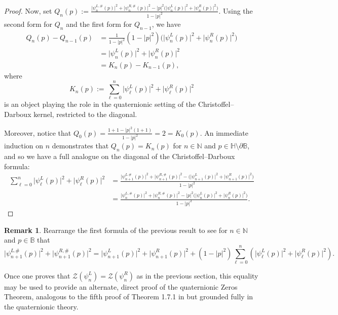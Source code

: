 \documentclass[11pt,reqno]{amsart}
\def\q{\psi}
\def\NN{\mathbb{N}}
\def\BB{\mathbb{B}}
\def\HH{\mathbb{H}}
\def\cZ{\mathcal{Z}}
\theoremstyle{definition}
\newtheorem{remark}[theorem]{Remark}
\numberwithin{equation}{section}
\begin{document}
\begin{proof}
Now, set \(Q_n(p) := \frac{\lvert \q_n^{L,\#}(p) \rvert^2 + \lvert \q_n^{R,\#}(p) \rvert^2 - \lvert p \rvert^2 \Big(\lvert \q_n^L(p)\rvert^2 + \lvert \q_n^R(p) \rvert^2\Big)}{1 - \lvert p \rvert^2}\). Using the second form for \(Q_n\) and the first form for \(Q_{n-1}\), we have
\begin{align*}
    Q_n(p) - Q_{n-1}(p) & = \frac{1}{1 - \lvert p \rvert^2} (1 - \lvert p \rvert^2)\Big(\lvert \q_n^L(p) \rvert^2 + \lvert \q_n^R(p) \rvert^2\Big) \\
    & = \lvert \q_n^L(p) \rvert^2 + \lvert \q_n^R(p) \rvert^2 \\
    & = K_n(p) - K_{n-1}(p),
\end{align*}
where
\[
    K_n(p) := \sum_{\ell = 0}^n \lvert \q_\ell^L(p) \rvert^2 + \lvert \q_\ell^R(p) \rvert^2
\]
is an object playing the role in the quaternionic setting of the Christoffel--Darboux kernel, restricted to the diagonal.

Moreover, notice that \(Q_0(p) = \frac{1 + 1 - \lvert p \rvert^2 (1 + 1)}{1 - \lvert p \rvert^2} = 2 = K_0(p)\). An immediate induction on \(n\) demonstrates that \(Q_n(p) = K_n(p)\) for \(n \in \NN\) and \(p \in \HH\setminus\partial\BB\), and so we have a full analogue on the diagonal of the Christoffel--Darboux formula:
\begin{align*}
    \sum_{\ell = 0}^n \lvert \q_\ell^L(p) \rvert^2 + \lvert \q_\ell^R(p) \rvert^2 & = \frac{\lvert \q_{n+1}^{L.\#}(p) \rvert^2 + \lvert \q_{n+1}^{R,\#}(p)\rvert^2 - \Big(\lvert \q_{n+1}^L(p) \rvert^2 + \lvert \q_{n+1}^R(p) \rvert^2\Big)}{1 - \lvert p \rvert^2} \\ 
    & = \frac{\lvert \q_n^{L,\#}(p) \rvert^2 + \lvert \q_n^{R,\#}(p) \rvert^2 - \lvert p \rvert^2 \Big(\lvert \q_n^L(p)\rvert^2 + \lvert \q_n^R(p) \rvert^2\Big)}{1 - \lvert p \rvert^2}.
\end{align*}
\end{proof}

\begin{remark}
    Rearrange the first formula of the previous result to see for \(n \in \NN\) and \(p \in \BB\) that
    \begin{equation*}
    \label{eq:CDDiag}
        \lvert \q_{n+1}^{L.\#}(p) \rvert^2 + \lvert \q_{n+1}^{R,\#}(p)\rvert^2 = \lvert \q_{n+1}^L(p) \rvert^2 + \lvert \q_{n+1}^R(p) \rvert^2 + (1 - \lvert p \rvert^2) \sum_{\ell = 0}^n (\lvert \q_\ell^L(p) \rvert^2 + \lvert \q_\ell^R(p) \rvert^2).
    \end{equation*}

    Once one proves that \(\cZ(\q_n^L) = \cZ(\q_n^R)\) as in the previous section, this equality may be used to provide an alternate, direct proof of the quaternionic Zeros Theorem, analogous to the fifth proof of Theorem 1.7.1 in \cite{Sim05a} but grounded fully in the quaternionic theory.
\end{remark}
\end{document}
